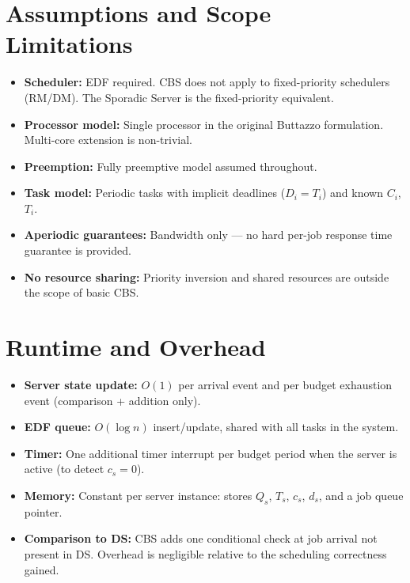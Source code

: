 \documentclass[conference]{IEEEtran}
\begin{document}
\section{Assumptions and Scope Limitations}

\begin{itemize}
  \item \textbf{Scheduler:} EDF required. CBS does not apply to
        fixed-priority schedulers (RM/DM). The Sporadic Server is the
        fixed-priority equivalent.
  \item \textbf{Processor model:} Single processor in the original
        Buttazzo formulation. Multi-core extension is non-trivial.
  \item \textbf{Preemption:} Fully preemptive model assumed throughout.
  \item \textbf{Task model:} Periodic tasks with implicit deadlines
        ($D_i = T_i$) and known $C_i$, $T_i$.
  \item \textbf{Aperiodic guarantees:} Bandwidth only --- no hard
        per-job response time guarantee is provided.
  \item \textbf{No resource sharing:} Priority inversion and shared
        resources are outside the scope of basic CBS.
\end{itemize}

\section{Runtime and Overhead}

\begin{itemize}
  \item \textbf{Server state update:} $O(1)$ per arrival event and
        per budget exhaustion event (comparison + addition only).
  \item \textbf{EDF queue:} $O(\log n)$ insert/update, shared with
        all tasks in the system.
  \item \textbf{Timer:} One additional timer interrupt per budget
        period when the server is active (to detect $c_s = 0$).
  \item \textbf{Memory:} Constant per server instance: stores $Q_s$,
        $T_s$, $c_s$, $d_s$, and a job queue pointer.
  \item \textbf{Comparison to DS:} CBS adds one conditional check at
        job arrival not present in DS. Overhead is negligible relative
        to the scheduling correctness gained.
\end{itemize}
\end{document}
